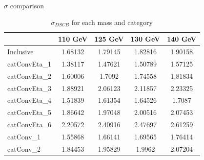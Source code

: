 \documentclass[10pt,UKenglish, leqno, xcolor = dvipsnames]{beamer}
\begin{document}
		\begin{frame}{$\sigma$ comparison}
			\vfill
			\centering
			\begin{table}[tbp]
				\centering
				\begin{tabular}{lcccc}
					\toprule[1.5pt]
					& 110 GeV	& 125 GeV	& 130 GeV	& 140 GeV	\\
					\midrule
					Inclusive & 1.68132 & 1.79145 & 1.82816 & 1.90158 \\ 
					\midrule
					catConvEta\_1 & 1.38117 & 1.47621 & 1.50789 & 1.57125 \\ 
					catConvEta\_2 & 1.60006 & 1.7092 & 1.74558 & 1.81834 \\ 
					catConvEta\_3 & 1.88921 & 2.06123 & 2.11857 & 2.23325 \\ 
					catConvEta\_4 & 1.51839 & 1.61354 & 1.64526 & 1.7087 \\ 
					catConvEta\_5 & 1.86642 & 1.97048 & 2.00516 & 2.07453 \\ 
					catConvEta\_6 & 2.20572 & 2.40916 & 2.47697 & 2.61259 \\
					\midrule
					catConv\_1 & 1.55868 & 1.66141 & 1.69565 & 1.76414 \\ 
					catConv\_2 & 1.84453 & 1.95829 & 1.9962 & 2.07204 \\ 
					\bottomrule[1.5pt]
				\end{tabular}
				\caption{$\sigma_{DSCB}$ for each mass and category}
			\end{table}
			\vfill
		\end{frame}
	
\end{document}
